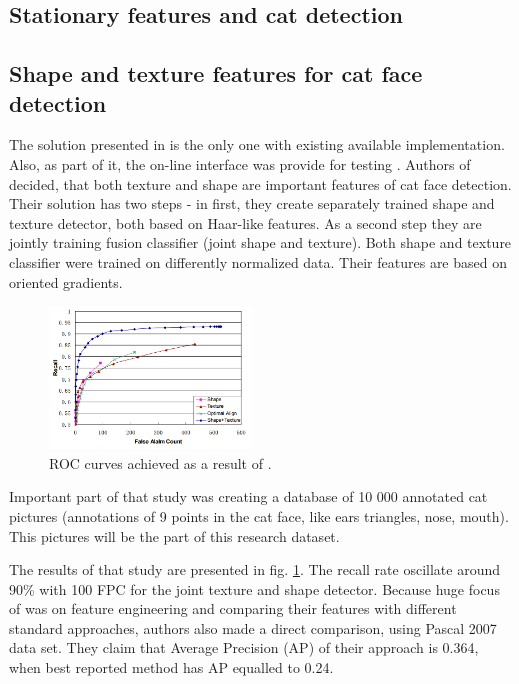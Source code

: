 \documentclass[hyperref]{acmtrans2e}
\begin{document}
\subsection{Stationary features and cat detection}

\subsection{Shape and texture features for cat face detection}
The solution presented in \cite{shape:2008} is the only one with existing available implementation. Also, as part of it, the on-line interface was provide for testing \cite{demo:2013}. Authors of \cite{shape:2008} decided, that both texture and shape are important features of cat face detection. Their solution has two steps - in first, they create separately trained shape and texture detector, both based on Haar-like features. As a second step they are jointly training fusion classifier (joint shape and texture). Both shape and texture classifier were trained on differently normalized data. Their features are based on oriented gradients.

\begin{figure}
\centering
    \includegraphics[width=0.48\textwidth]{roc_shape}
  \caption{ROC curves achieved as a result of \protect\cite{shape:2008}.}
  \label{fig:roc_shape}
\end{figure}

Important part of that study was creating a database of 10 000 annotated cat pictures \cite{base:2008} (annotations of 9 points in the cat face, like ears triangles, nose, mouth). This pictures will be the part of this research dataset.

The results of that study are presented in fig. \ref{fig:roc_shape}. The recall rate oscillate around 90\% with 100 FPC for the joint texture and shape detector. Because huge focus of \cite{shape:2008} was on feature engineering and comparing their features with different standard approaches, authors also made a direct comparison, using Pascal 2007 data set. They claim that Average Precision (AP) of their approach is 0.364, when best reported method has AP equalled to 0.24. 
\end{document}
